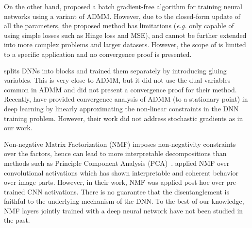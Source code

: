 On the other hand, \cite{taylor2016training} proposed a batch gradient-free algorithm for training neural networks using a variant of ADMM. However, due to the closed-form update of all the parameters, the proposed method has limitations (\textit{e.g.} only capable of using simple losses such as Hinge loss and MSE), and cannot be further extended into more complex problems and larger datasets. However, the scope of
\cite{zhang2016efficient} is limited to a specific application and no convergence proof is presented.


\cite{gotmare2018decoupling} splits DNNs into blocks and trained them separately by introducing gluing variables. This is very close to ADMM, but it did not use the dual variables common in ADMM and did not present a convergence proof for their method.
Recently, \cite{wang2019admm,zeng2019convergence} have provided convergence analysis of ADMM (to a stationary point) in deep learning by linearly approximating the non-linear constraints in the DNN training problem. However, their work did not address stochastic gradients as in our work.


Non-negative Matrix Factorization (NMF) imposes  non-negativity constraints over the factors, hence can lead to more interpretable decompositions than methods such as Principle Component Analysis (PCA)~\cite{lee1999learning,liu2011constrained}.  
\cite{collins2018deep} applied NMF over convolutional activations which has shown interpretable and coherent behavior over image parts. However, in their work, NMF was applied post-hoc over pre-trained CNN activations. There is no guarantee that the disentanglement is faithful to the underlying mechanism of the DNN. 
To the best of our knowledge, NMF layers jointly trained with a deep neural network have not been studied in the past.
